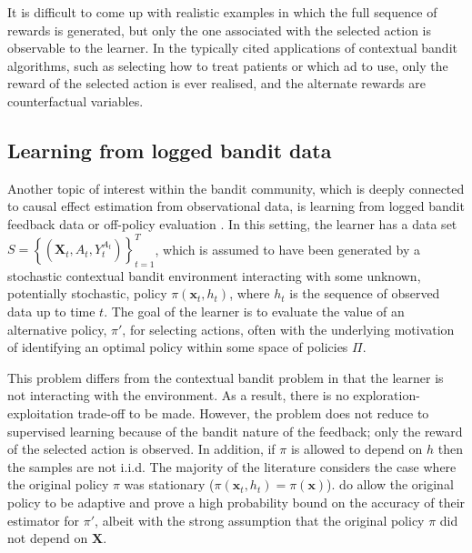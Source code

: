 \documentclass[11pt,a4paper,twoside]{report}
\newcommand{\set}[1]{\left\{#1\right\}}
\newcommand{\cfb}[2]{{#1}_t^{#2}} %
\renewcommand{\vec}[1]{\boldsymbol{#1}}
\theoremstyle{plain}
\theoremstyle{definition}
\begin{document}
It is difficult to come up with realistic examples in which the full sequence of rewards is generated, but only the one associated with the selected action is observable to the learner. In the typically cited applications of contextual bandit algorithms, such as selecting how to treat patients or which ad to use, only the reward of the selected action is ever realised, and the alternate rewards are counterfactual variables.

\subsection{Learning from logged bandit data}
\label{sec:off-policy-evaluation}
Another topic of interest within the bandit community, which is deeply connected to causal effect estimation from observational data, is learning from logged bandit feedback data or off-policy evaluation \citep{Langford2008a,strehl2010learning,Li2010,Dudik2011,Bottou2013,Swaminathan2015}. In this setting, the learner has a data set $S = \set{(\vec{X}_t,A_t,\cfb{Y}{A_t})}_{t=1}^T$, which is assumed to have been generated by a stochastic contextual bandit environment interacting with some unknown, potentially stochastic, policy $\pi(\vec{x}_t,h_t)$, where $h_t$ is the sequence of observed data up to time $t$. The goal of the learner is to evaluate the value of an alternative policy, $\pi'$, for selecting actions, often with the underlying motivation of identifying an optimal policy within some space of policies $\Pi$. 

This problem differs from the contextual bandit problem in that the learner is not interacting with the environment. As a result, there is no exploration-exploitation trade-off to be made. However, the problem does not reduce to supervised learning because of the bandit nature of the feedback; only the reward of the selected action is observed. In addition, if $\pi$ is allowed to depend on $h$ then the samples are not i.i.d. The majority of the literature considers the case where the original policy $\pi$ was stationary ($\pi(\vec{x}_t,h_t) = \pi(\vec{x})$). \citet{Langford2008a} do allow the original policy to be adaptive and prove a high probability bound on the accuracy of their estimator for $\pi'$, albeit with the strong assumption that the original policy $\pi$ did not depend on $\vec{X}$. 
\end{document}
